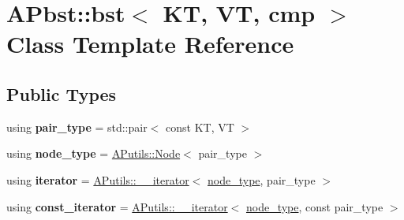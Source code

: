 \hypertarget{class_a_pbst_1_1bst}{}\section{A\+Pbst\+:\+:bst$<$ KT, VT, cmp $>$ Class Template Reference}
\label{class_a_pbst_1_1bst}
\subsection*{Public Types}
\begin{DoxyCompactItemize}
\item 
\mbox{\label{class_a_pbst_1_1bst_a07c5af67ac055dd44b10bb7aeef8a22e}} 
using {\bfseries pair\+\_\+type} = std\+::pair$<$ const KT, VT $>$
\item 
\mbox{\label{class_a_pbst_1_1bst_a7ade0516ee179e41484b6ea1fe38d88b}} 
using {\bfseries node\+\_\+type} = \hyperlink{struct_a_putils_1_1_node}{A\+Putils\+::\+Node}$<$ pair\+\_\+type $>$
\item 
\mbox{\label{class_a_pbst_1_1bst_a3b94f8a056ddb8bf973480b205e335e0}} 
using {\bfseries iterator} = \hyperlink{class_a_putils_1_1____iterator}{A\+Putils\+::\+\_\+\+\_\+iterator}$<$ \hyperlink{struct_a_putils_1_1_node}{node\+\_\+type}, pair\+\_\+type $>$
\item 
\mbox{\label{class_a_pbst_1_1bst_a5376f9dd7416a465806324532d29547e}} 
using {\bfseries const\+\_\+iterator} = \hyperlink{class_a_putils_1_1____iterator}{A\+Putils\+::\+\_\+\+\_\+iterator}$<$ \hyperlink{struct_a_putils_1_1_node}{node\+\_\+type}, const pair\+\_\+type $>$
\end{DoxyCompactItemize}
